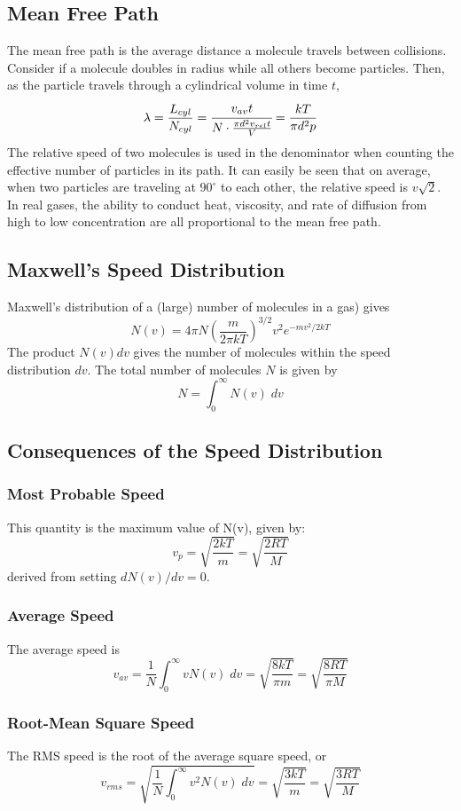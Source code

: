 \documentclass[../PhysicsFormulae.tex]{subfiles}
\begin{document}
\subsection{Mean Free Path}
The mean free path is the average distance a molecule travels between collisions. Consider if a molecule doubles in radius while all others become particles. Then, as the particle travels through a cylindrical volume in time $t$, 
\[ \lambda = \frac{L_{cyl}}{N_{cyl}} = \cfrac{v_{av}t}{N \cdot \frac{\pi d^2 v_{rel}t}{V}} = \frac{kT}{\pi d^2p} \]
The relative speed of two molecules is used in the denominator when counting the effective number of particles in its path. It can easily be seen that on average, when two particles are traveling at $90^{\circ}$ to each other, the relative speed is $v\sqrt{2}$. In real gases, the ability to conduct heat, viscosity, and rate of diffusion from high to low concentration are all proportional to the mean free path. 

\subsection{Maxwell's Speed Distribution}
Maxwell's distribution of a (large) number of molecules in a gas) gives
\[ N(v)= 4\pi N \left(\frac{m}{2\pi k T}\right)^{3/2}v^2 e^{-mv^2/2kT} \]
The product $N(v)dv$ gives the number of molecules within the speed distribution $dv$. The total number of molecules $N$ is given by 
\[ N = \int_0^{\infty} N(v)\; dv \]

\subsection{Consequences of the Speed Distribution}
\subsubsection{Most Probable Speed}
This quantity is the maximum value of N(v), given by:
\[ v_p = \sqrt{\frac{2kT}{m}} = \sqrt{\frac{2RT}{M}} \]
derived from setting $dN(v)/dv = 0$. 

\subsubsection{Average Speed}
The average speed is 
\[ v_{av} = \frac{1}{N} \int_0^{\infty} vN(v) \; dv = \sqrt{\frac{8kT}{\pi m}} = \sqrt{\frac{8RT}{\pi M}} \]

\subsubsection{Root-Mean Square Speed}
The RMS speed is the root of the average square speed, or
\[ v_{rms} = \sqrt{\frac{1}{N} \int_0^{\infty} v^2 N(v) \; dv} = \sqrt{\frac{3kT}{m}} = \sqrt{\frac{3RT}{M}} \]
\end{document}

